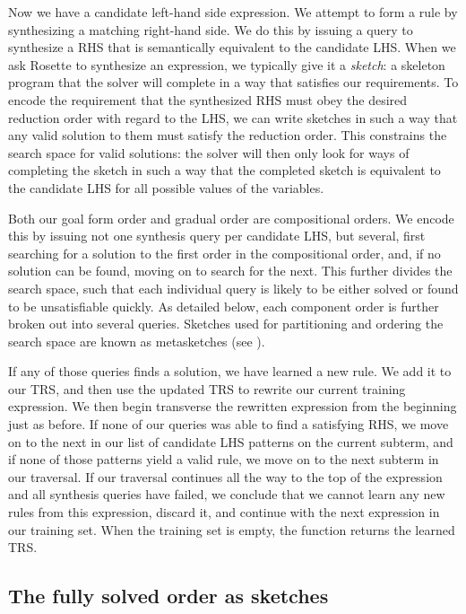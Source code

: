 Now we have a candidate left-hand side expression. We attempt to form a rule by synthesizing a matching right-hand side. We do this by issuing a query to synthesize a RHS that is semantically equivalent to the candidate LHS. When we ask Rosette to synthesize an expression, we typically give it a \emph{sketch}: a skeleton program that the solver will complete in a way that satisfies our requirements. To encode the requirement that the synthesized RHS must obey the desired reduction order with regard to the LHS, we can write sketches in such a way that any valid solution to them must satisfy the reduction order. This constrains the search space for valid solutions: the solver will then only look for ways of completing the sketch in such a way that the completed sketch is equivalent to the candidate LHS for all possible values of the variables.

Both our goal form order and gradual order are compositional orders. We encode this by issuing not one synthesis query per candidate LHS, but several, first searching for a solution to the first order in the compositional order, and, if no solution can be found, moving on to search for the next. This further divides the search space, such that each individual query is likely to be either solved or found to be unsatisfiable quickly. As detailed below, each component order is further broken out into several queries. Sketches used for partitioning and ordering the search space are known as metasketches (see \cite{bornholt2016optimizing}).

If any of those queries finds a solution, we have learned a new rule. We add it to our TRS, and then use the updated TRS to rewrite our current training expression. We then begin transverse the rewritten expression from the beginning just as before. If none of our queries was able to find a satisfying RHS, we move on to the next in our list of candidate LHS patterns on the current subterm, and if none of those patterns yield a valid rule, we move on to the next subterm in our traversal. If our traversal continues all the way to the top of the expression and all synthesis queries have failed, we conclude that we cannot learn any new rules from this expression, discard it, and continue with the next expression in our training set. When the training set is empty, the function returns the learned TRS.

\subsection{The fully solved order as sketches}

